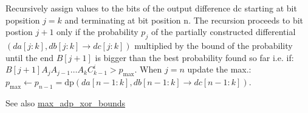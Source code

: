 \-Recursively assign values to the bits of the output difference {\ttfamily dc} starting at bit popsition $j = k$ and terminating at bit position {\ttfamily n}. \-The recursion proceeds to bit postion $j + 1$ only if the probability $p_j$ of the partially constructed differential $(da[j:k], db[j:k] \rightarrow dc[j:k])$ multiplied by the bound of the probability until the end $B[j+1]$ is bigger than the best probability found so far i.\-e. if\-: $B[j+1] A_{j} A_{j-1} \ldots A_{k} C^{i}_{k-1} > p_{\mathrm{max}}$. \-When $j = n$ update the max.\-: $p_{\mathrm{max}} \leftarrow p_{n-1} = \mathrm{dp}(da[n-1:k],db[n-1:k] \rightarrow dc[n-1:k])$.

\begin{DoxySeeAlso}{\-See also}
\hyperlink{max-adp-xor_8hh_ab44746fae93c11ea36bd24f4f874669d}{max\-\_\-adp\-\_\-xor\-\_\-bounds} 
\end{DoxySeeAlso}
